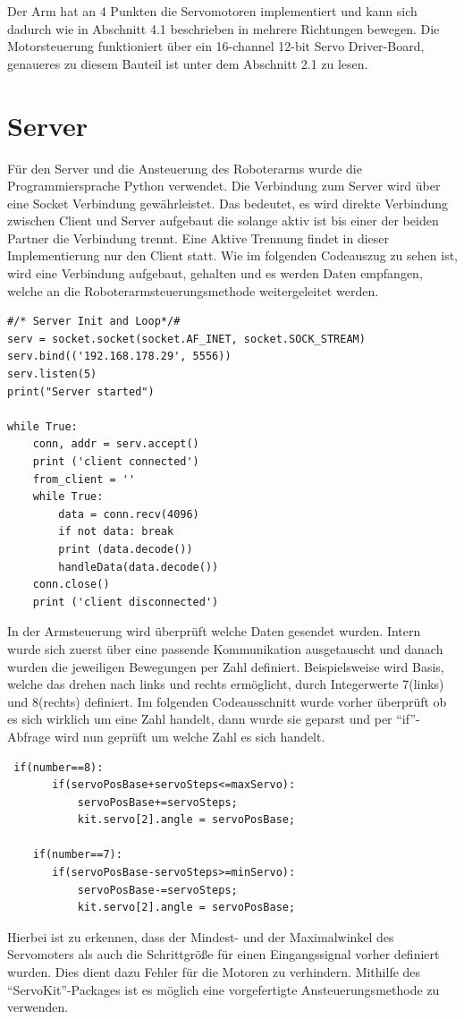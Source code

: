 \documentclass[12pt,					%
							 oneside,			%
							 a4paper,			%
							 halfparskip,		%
							 liststotoc,			%
							 bibtotoc,			%
							 fleqn,				%
							 pointlessnumbers]	%
							 {scrreprt}
\begin{document}
Der Arm hat an 4 Punkten die Servomotoren implementiert und kann sich dadurch wie in Abschnitt 4.1 beschrieben in mehrere Richtungen bewegen. Die Motorsteuerung funktioniert über ein 16-channel 12-bit Servo Driver-Board, genaueres zu diesem Bauteil ist unter dem Abschnitt 2.1 zu lesen.
\newpage
\section{Server}
Für den Server und die Ansteuerung des Roboterarms wurde die Programmiersprache Python verwendet. Die Verbindung zum Server wird über eine Socket Verbindung gewährleistet. Das bedeutet, es wird direkte Verbindung zwischen Client und Server aufgebaut die solange aktiv ist bis einer der beiden Partner die Verbindung trennt. Eine Aktive Trennung findet in dieser Implementierung nur den Client statt. Wie im folgenden Codeauszug zu sehen ist, wird eine Verbindung aufgebaut, gehalten und es werden Daten empfangen, welche an die Roboterarmsteuerungsmethode weitergeleitet werden.
\begin{lstlisting}
#/* Server Init and Loop*/#
serv = socket.socket(socket.AF_INET, socket.SOCK_STREAM)
serv.bind(('192.168.178.29', 5556))
serv.listen(5)
print("Server started")

while True:
    conn, addr = serv.accept()
    print ('client connected')
    from_client = ''
    while True:
        data = conn.recv(4096)
        if not data: break
        print (data.decode())
        handleData(data.decode())
    conn.close()
    print ('client disconnected')
\end{lstlisting}


In der Armsteuerung wird überprüft welche Daten gesendet wurden. Intern wurde sich zuerst über eine passende Kommunikation ausgetauscht und danach wurden die jeweiligen Bewegungen per Zahl definiert. Beispielsweise wird Basis, welche das drehen nach links und rechts ermöglicht, durch Integerwerte 7(links) und 8(rechts) definiert. Im folgenden Codeausschnitt wurde vorher überprüft ob es sich wirklich um eine Zahl handelt, dann wurde sie geparst und per ``if''-Abfrage wird nun geprüft um welche Zahl es sich handelt. 
\newpage
\begin{lstlisting}
 if(number==8):
       if(servoPosBase+servoSteps<=maxServo):           
           servoPosBase+=servoSteps;
           kit.servo[2].angle = servoPosBase;
        
    if(number==7):
       if(servoPosBase-servoSteps>=minServo):           
           servoPosBase-=servoSteps;
           kit.servo[2].angle = servoPosBase;
\end{lstlisting}
Hierbei ist zu erkennen, dass der Mindest- und der Maximalwinkel des Servomoters als auch die Schrittgröße für einen Eingangssignal vorher definiert wurden. Dies dient dazu Fehler für die Motoren zu verhindern.  Mithilfe des ``ServoKit''-Packages ist es möglich eine vorgefertigte Ansteuerungsmethode zu verwenden.
\end{document}
